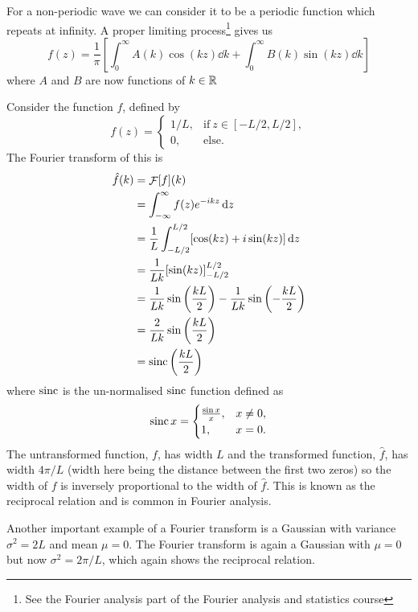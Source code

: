     For a non-periodic wave we can consider it to be a periodic function which repeats at infinity.
    A proper limiting process\footnote{See the Fourier analysis part of the Fourier analysis and statistics course} gives us
    \[f(z) = \frac{1}{\pi} \left[ \int_{0}^{\infty} A(k)\cos(kz)\dd{k} + \int_{0}^{\infty} B(k)\sin(kz)\dd{k} \right]\]
    where \(A\) and \(B\) are now functions of \(k\in\mathbb{R}\)
    
    \begin{example}
        Consider the function \(f\), defined by
        \[
            f(z) =
            \begin{cases}
                1/L, & \text{if}~z\in[-L/2, L/2],\\
                0, & \text{else}.
            \end{cases}
        \]
        The Fourier transform of this is
        \begin{align*}
            \hat{f}(k) &= \mathop{\mathcal{F}}[f](k) \\
            &= \int_{-\infty}^{\infty} f(z)e^{-ikz}\dd{z}\\
            &= \frac{1}{L}\int_{-L/2}^{L/2} [\cos(kz) + i\sin(kz)]\dd{z}\\
            &= \frac{1}{Lk}[\sin(kz)]_{-L/2}^{L/2}\\
            &= \frac{1}{Lk}\sin\left( \frac{kL}{2} \right) - \frac{1}{Lk}\sin\left( -\frac{kL}{2} \right)\\
            &= \frac{2}{Lk}\sin\left( \frac{kL}{2} \right)\\
            &=\operatorname{sinc}\left( \frac{kL}{2} \right)
        \end{align*}
        where \(\operatorname{sinc}\) is the un-normalised \(\operatorname{sinc}\) function defined as
        \[
            \operatorname{sinc} x =
            \begin{cases}
                \frac{\sin x}{x}, & x \ne 0,\\
                1, & x = 0.
            \end{cases}
        \]
        The untransformed function, \(f\), has width \(L\) and the transformed function, \(\hat{f}\), has width \(4\pi/L\) (width here being the distance between the first two zeros) so the width of \(f\) is inversely proportional to the width of \(\hat{f}\).
        This is known as the reciprocal relation and is common in Fourier analysis.
    \end{example}
    \begin{example}
        Another important example of a Fourier transform is a Gaussian with variance \(\sigma^2 = 2L\) and mean \(\mu = 0\).
        The Fourier transform is again a Gaussian with \(\mu = 0\) but now \(\sigma^2 = 2\pi/L\), which again shows the reciprocal relation.
    \end{example}
